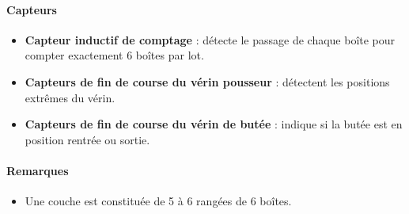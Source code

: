\paragraph{Capteurs}
\begin{itemize}
    \item \textbf{Capteur inductif de comptage} : détecte le passage de chaque boîte pour compter exactement 6 boîtes par lot.
    \item \textbf{Capteurs de fin de course du vérin pousseur} : détectent les positions extrêmes du vérin. 
    \item \textbf{Capteurs de fin de course du vérin de butée} : indique si la butée est en position rentrée ou sortie.
\end{itemize}

\paragraph{Remarques}
\begin{itemize}
    \item Une couche est constituée de 5 à 6 rangées de 6 boîtes.
\end{itemize}
